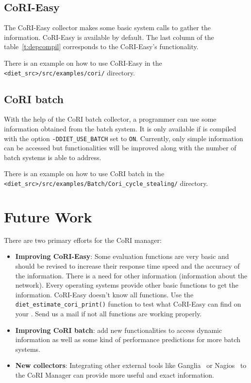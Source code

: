 \subsection{CoRI-Easy}
The CoRI-Easy collector makes some basic system calls to gather the
information. CoRI-Easy is available by default. The last column of the
table~\ref{t:depcompil} corresponds to the CoRI-Easy's functionality.

There is an example on how to use CoRI-Easy in the
\verb!<diet_src>/src/examples/cori/! directory.

\subsection{CoRI batch}\label{section:cori_batch}

With the help of the CoRI batch collector, a \sed programmer can use some
information obtained from the batch system. It is only available if \diet is
compiled with the option \texttt{-DDIET\_USE\_BATCH} set to
\texttt{ON}. Currently, only simple information can be accessed but
functionalities will be improved along with the number of batch systems \diet
is able to address.

There is an example on how to use CoRI batch in
the\\ \verb!<diet_src>/src/examples/Batch/Cori_cycle_stealing/! directory.

\section{Future Work}

There are two primary efforts for the CoRI manager:
\begin{itemize}
\item \textbf{Improving CoRI-Easy}: Some evaluation functions are very basic
  and should be revised to increase their response time speed and the accuracy
  of the information. There is a need for other information (\ie information
  about the network). Every operating systems provide other basic functions to
  get the information. CoRI-Easy doesn't know all functions. Use the
  \texttt{diet\_estimate\_cori\_print()} function to test what CoRI-Easy can
  find on your \sed. Send us a mail if not  all functions are working properly.

\item \textbf{Improving CoRI batch}: add new functionalities to access dynamic
  information as well as some kind of performance predictions for more batch
  systems.

\item \textbf{New collectors}: Integrating other external tools like
  Ganglia~\cite{Ganglia} or Nagios~\cite{Nagios} to the CoRI Manager can
  provide more useful and exact information.
\end{itemize}

